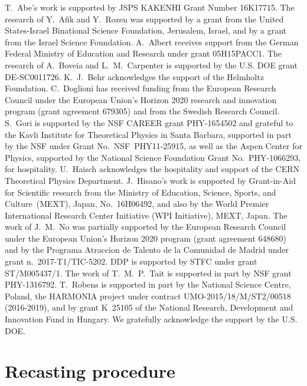 \documentclass[a4paper, 11pt,notoc]{article}
\begin{document}
T.~Abe's work is supported by JSPS KAKENHI Grant Number 16K17715. The research of Y.~Afik and Y.~Rozen was supported by a grant from the United States-Israel Binational Science Foundation, Jerusalem, Israel, and by a grant from the Israel Science Foundation.  A.~Albert receives support from the German Federal Ministry of Education and Research under grant 05H15PACC1. The research of A.~Boveia and L.~M.~Carpenter is supported by the U.S. DOE grant  DE-SC0011726. K.~J.~Behr acknowledges the support of the Helmholtz Foundation. C.~Doglioni has received funding from the European Research Council under the European Union's Horizon 2020 research and innovation program (grant agreement 679305) and from the Swedish Research Council.  S.~Gori is supported by the NSF CAREER grant PHY-1654502 and grateful to  the Kavli Institute for Theoretical Physics in Santa Barbara, supported in part by the NSF under Grant No.~NSF~PHY11-25915, as well as the Aspen Center for Physics, supported by the National Science Foundation Grant No.~PHY-1066293, for  hospitality. U.~Haisch acknowledges the hospitality and support of the CERN Theoretical Physics Department. J.~Hisano's work is supported by Grant-in-Aid for Scientific research from the Ministry of Education, Science, Sports, and Culture~(MEXT), Japan, No.~16H06492, and also by the World Premier International Research Center Initiative (WPI Initiative), MEXT, Japan.  The work of J.~M.~No was partially supported by the European Research Council under the European Union's Horizon 2020 program (grant agreement 648680) and by the Programa Atraccion de Talento de la Comunidad de Madrid under grant n.~2017-T1/TIC-5202. DDP is supported by STFC under grant ST/M005437/1.  The work of T.~M.~P.~Tait is supported in part by NSF grant PHY-1316792. T.~Robens is supported in part by the National Science Centre, Poland, the HARMONIA project under contract UMO-2015/18/M/ST2/00518 (2016-2019), and by grant K~25105 of the National Research, Development and Innovation Fund in Hungary. We gratefully acknowledge the support by the U.S. DOE. 


\appendix

\section{Recasting procedure}
\label{app:recast}
\end{document}
